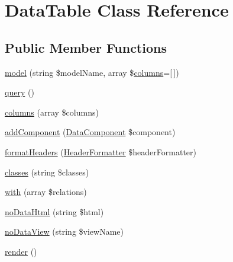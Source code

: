 \hypertarget{classhamburgscleanest_1_1_data_tables_1_1_models_1_1_data_table}{}\section{Data\+Table Class Reference}
\label{classhamburgscleanest_1_1_data_tables_1_1_models_1_1_data_table}
\subsection*{Public Member Functions}
\begin{DoxyCompactItemize}
\item 
\hyperlink{classhamburgscleanest_1_1_data_tables_1_1_models_1_1_data_table_aed2405fdf602895cf021ddf2de67f37c}{model} (string \$model\+Name, array \$\hyperlink{classhamburgscleanest_1_1_data_tables_1_1_models_1_1_data_table_aa58d366fa31ae19686c78817af00407c}{columns}=\mbox{[}$\,$\mbox{]})
\item 
\hyperlink{classhamburgscleanest_1_1_data_tables_1_1_models_1_1_data_table_a8dbd35d765e8ff0d1c34461ef67c5abf}{query} ()
\item 
\hyperlink{classhamburgscleanest_1_1_data_tables_1_1_models_1_1_data_table_aa58d366fa31ae19686c78817af00407c}{columns} (array \$columns)
\item 
\hyperlink{classhamburgscleanest_1_1_data_tables_1_1_models_1_1_data_table_af5dfafab4f9d6be74f7a9836cfbc3bed}{add\+Component} (\hyperlink{classhamburgscleanest_1_1_data_tables_1_1_models_1_1_data_component}{Data\+Component} \$component)
\item 
\hyperlink{classhamburgscleanest_1_1_data_tables_1_1_models_1_1_data_table_ab215f578c0cd2a411123b4878fa8fa55}{format\+Headers} (\hyperlink{interfacehamburgscleanest_1_1_data_tables_1_1_interfaces_1_1_header_formatter}{Header\+Formatter} \$header\+Formatter)
\item 
\hyperlink{classhamburgscleanest_1_1_data_tables_1_1_models_1_1_data_table_a813e5943086af6dacdea0ffc17b284d6}{classes} (string \$classes)
\item 
\hyperlink{classhamburgscleanest_1_1_data_tables_1_1_models_1_1_data_table_a27b8523da3acb9865571844d5487f6a0}{with} (array \$relations)
\item 
\hyperlink{classhamburgscleanest_1_1_data_tables_1_1_models_1_1_data_table_a82b20d38c42a9e462cdfe91b77b805a7}{no\+Data\+Html} (string \$html)
\item 
\hyperlink{classhamburgscleanest_1_1_data_tables_1_1_models_1_1_data_table_a3983a155c93b691cd1e069a3e46baaf6}{no\+Data\+View} (string \$view\+Name)
\item 
\hyperlink{classhamburgscleanest_1_1_data_tables_1_1_models_1_1_data_table_afde88292c44dc59faf017738dae6dffb}{render} ()
\end{DoxyCompactItemize}


